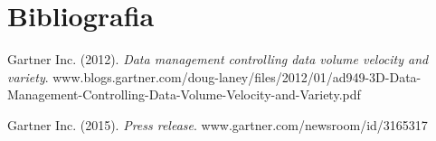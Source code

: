 \chapter*{Bibliografia}

\begin{references}

\item
Gartner Inc. (2012). \textit{Data management controlling data volume velocity and variety}.
www.blogs.gartner.com/doug-laney/files/2012/01/ad949-3D-Data-Management-Controlling-Data-Volume-Velocity-and-Variety.pdf

\item
Gartner Inc. (2015). \textit{Press release}.
www.gartner.com/newsroom/id/3165317

\end{references}
